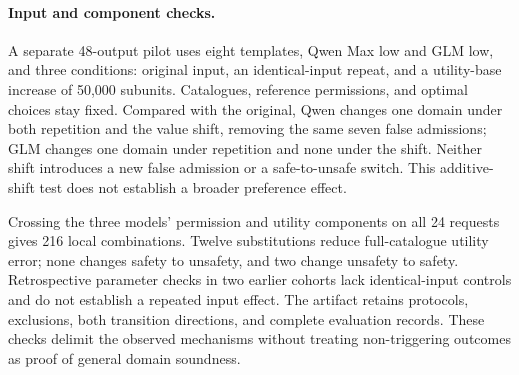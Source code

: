 \paragraph{Input and component checks.}
A separate 48-output pilot uses eight templates, Qwen Max low and GLM low, and three conditions: original input, an identical-input repeat, and a utility-base increase of 50,000 subunits. Catalogues, reference permissions, and optimal choices stay fixed. Compared with the original, Qwen changes one domain under both repetition and the value shift, removing the same seven false admissions; GLM changes one domain under repetition and none under the shift. Neither shift introduces a new false admission or a safe-to-unsafe switch. This additive-shift test does not establish a broader preference effect.

\begin{table}[!t]
\centering\small\setlength{\tabcolsep}{5pt}

\caption{Frozen-specification replay results, grouped by DeepSeek effort setting. Each row pools 216 saved outputs collected on 72 tasks. Unsafe domain counts specifications admitting an unauthorized offer; Unsafe selection counts unauthorized purchases. Invalid counts refer to the mixed and unsafe-only catalogues, respectively; invalid executions are not treated as safe.}
\label{tab:replay}
\end{table}

Crossing the three models' permission and utility components on all 24 requests gives 216 local combinations. Twelve substitutions reduce full-catalogue utility error; none changes safety to unsafety, and two change unsafety to safety. Retrospective parameter checks in two earlier cohorts lack identical-input controls and do not establish a repeated input effect. The artifact retains protocols, exclusions, both transition directions, and complete evaluation records. These checks delimit the observed mechanisms without treating non-triggering outcomes as proof of general domain soundness.

